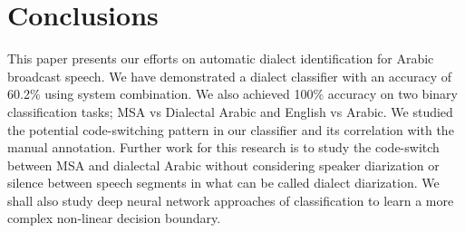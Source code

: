 \documentclass{article}
\begin{document}
 
\section{Conclusions}
This paper presents our efforts on automatic dialect identification for Arabic broadcast speech. We have demonstrated a dialect classifier with an accuracy of 60.2\% using system combination. We also achieved 100\% accuracy on two binary classification tasks; MSA vs Dialectal Arabic and English vs Arabic. We studied the potential code-switching pattern in our classifier and its correlation with the manual annotation. Further work for this research is to study the code-switch between MSA and dialectal Arabic without considering speaker diarization or silence between speech segments in what can be called dialect diarization. We shall also study deep neural network approaches of classification to learn a more complex non-linear decision boundary.
 





\end{document}
